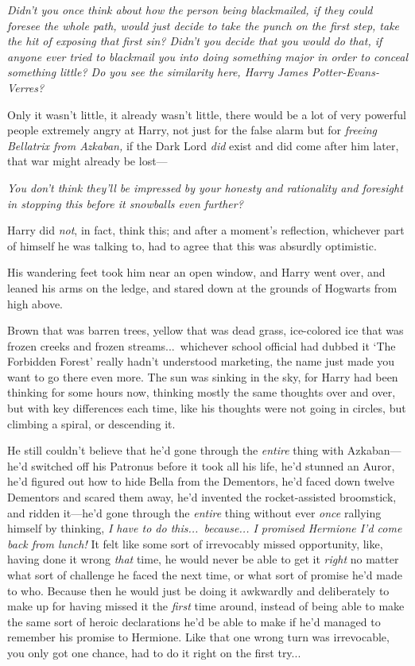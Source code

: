 \emph{Didn’t you once think about how the person being blackmailed, if they could foresee the whole path, would just decide to take the punch on the first step, take the hit of exposing that first sin? Didn’t you decide that you would do that, if anyone ever tried to blackmail you into doing something major in order to conceal something little? Do you see the similarity here, Harry James Potter-Evans-Verres?}

Only it wasn’t little, it already wasn’t little, there would be a lot of very powerful people extremely angry at Harry, not just for the false alarm but for \emph{freeing Bellatrix from Azkaban,} if the Dark Lord \emph{did} exist and did come after him later, that war might already be lost—

\emph{You don’t think they’ll be impressed by your honesty and rationality and foresight in stopping this before it snowballs even further?}

Harry did \emph{not}, in fact, think this; and after a moment’s reflection, whichever part of himself he was talking to, had to agree that this was absurdly optimistic.

His wandering feet took him near an open window, and Harry went over, and leaned his arms on the ledge, and stared down at the grounds of Hogwarts from high above.

Brown that was barren trees, yellow that was dead grass, ice-colored ice that was frozen creeks and frozen streams...\ whichever school official had dubbed it ‘The Forbidden Forest’ really hadn’t understood marketing, the name just made you want to go there even more. The sun was sinking in the sky, for Harry had been thinking for some hours now, thinking mostly the same thoughts over and over, but with key differences each time, like his thoughts were not going in circles, but climbing a spiral, or descending it.

He still couldn’t believe that he’d gone through the \emph{entire} thing with Azkaban—he’d switched off his Patronus before it took all his life, he’d stunned an Auror, he’d figured out how to hide Bella from the Dementors, he’d faced down twelve Dementors and scared them away, he’d invented the rocket-assisted broomstick, and ridden it—he’d gone through the \emph{entire} thing without ever \emph{once} rallying himself by thinking, \emph{I have to do this...\ because... I promised Hermione I’d come back from lunch!} It felt like some sort of irrevocably missed opportunity, like, having done it wrong \emph{that} time, he would never be able to get it \emph{right} no matter what sort of challenge he faced the next time, or what sort of promise he’d made to who. Because then he would just be doing it awkwardly and deliberately to make up for having missed it the \emph{first} time around, instead of being able to make the same sort of heroic declarations he’d be able to make if he’d managed to remember his promise to Hermione. Like that one wrong turn was irrevocable, you only got one chance, had to do it right on the first try...

